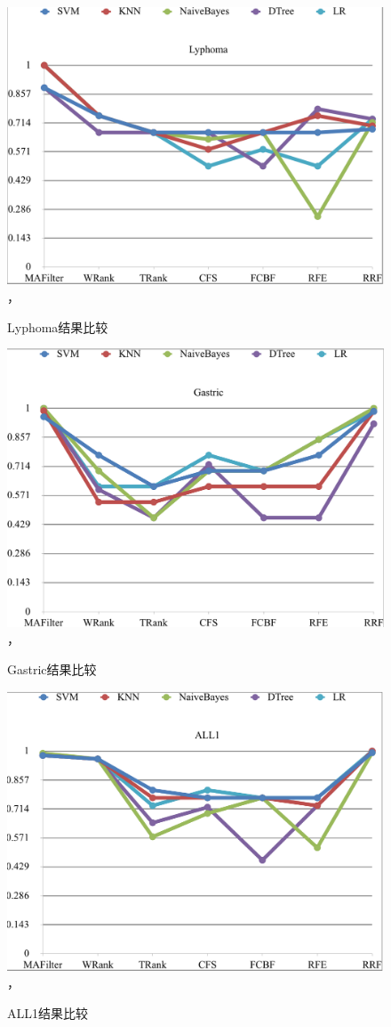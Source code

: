 \documentclass{njubachelor}
\begin{document}
\begin{figure}[!ht]
  \centering
  \includegraphics[width=5in]{pic/fig7}， 
  \caption{Lyphoma结果比较}
\end{figure}

\begin{figure}[!ht]
  \centering
  \includegraphics[width=5in]{pic/fig8}， 
  \caption{Gastric结果比较}
\end{figure}

\begin{figure}[!ht]
  \centering
  \includegraphics[width=5in]{pic/fig9}， 
  \caption{ALL1结果比较}
\end{figure}
\end{document}
